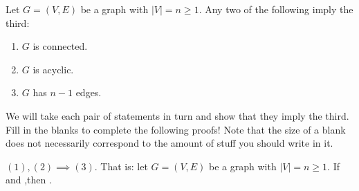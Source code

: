 \documentclass{tufte-handout}
\begin{document}
\begin{thm}[Trees]
  Let $G = (V,E)$ be a graph with $|V| = n \geq 1$.  Any two of the following
  imply the third:
  \begin{enumerate}
  \item $G$ is connected.
  \item $G$ is acyclic.
  \item $G$ has $n-1$ edges.
  \end{enumerate}
\end{thm}

We will take each pair of statements in turn and show that they imply
the third.  Fill in the blanks to complete the following proofs!  Note
that the size of a blank does not necessarily correspond to the
amount of stuff you should write in it.

\begin{lem} \label{lem:onetwothree}
  $(1), (2) \implies (3)$.  That is: let $G = (V,E)$ be a graph with $|V|
  = n \geq 1$.  If \blank\linebreak and \blank,\linebreak then \blank.
\end{lem}
\end{document}
